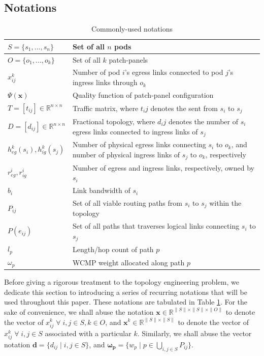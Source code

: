 \documentclass[sigconf]{acmart}
\theoremstyle{definition}
\begin{document}
\subsection{Notations}
\begin{table}
\begin{tabular}{|p{2.7cm}|p{5.3cm}|}
\hline
$S = \{s_1, ..., s_n\}$ & Set of all $n$ pods\\
\hline
$O = \{o_1, ..., o_k\}$ & Set of all $k$ patch-panels\\
\hline
$x_{ij}^k$ & Number of pod $i$'s egress links connected to pod $j$'s ingress links through $o_k$\\ 
\hline
$\Psi(\mathbf{x})$ & Quality function of patch-panel configuration\\
\hline
$T = [t_{ij}] \in \mathbb{R}^{n\times n}$ & Traffic matrix, where $t_ij$ denotes the sent from $s_i$ to $s_j$\\ 
\hline
$D = [d_{ij}] \in \mathbb{R}^{n\times n}$ & Fractional topology, where $d_ij$ denotes the number of $s_i$ egress links connected to ingress links of $s_j$\\ 
\hline
$h_{eg}^k(s_i), h_{ig}^k(s_j)$ & Number of physical egress links connecting $s_i$ to $o_k$, and number of physical ingress links of $s_j$ to $o_k$, respectively\\
\hline
$r_{eg}^i, r_{ig}^i$ & Number of egress and ingress links, respectively, owned by $s_i$\\
\hline
$b_i$ & Link bandwidth of $s_i$\\
\hline
$P_{ij}$ & Set of all viable routing paths from $s_i$ to $s_j$ within the topology\\
\hline
$P(e_{ij})$ & Set of all paths that traverses logical links connecting $s_i$ to $s_j$\\
\hline
$l_p$ & Length/hop count of path $p$ \\
\hline

$\omega_{p}$ & WCMP weight allocated along path $p$ \\
\hline
\end{tabular}
\caption{Commonly-used notations} 
\label{table:notations}
\end{table}
 Before giving a rigorous treatment to the topology engineering problem, we dedicate this section to introducing a series of recurring notations that will be used throughout this paper. These notations are tabulated in Table \ref{table:notations}. For the sake of convenience, we shall abuse the notation $\mathbf{x} \in \mathbb{R}^{\lVert S \lVert \times \lVert S \lVert \times \lVert O \lVert}$ to denote the vector of $x_{ij}^k \; \forall \; i, j \in S, k \in O$, and $\mathbf{x}^k \in \mathbb{R}^{\lVert S \lVert \times \lVert S \lVert}$ to denote the vector of $x_{ij}^k \; \forall \; i, j \in S$ associated with a particular $k$. Similarly, we shall abuse the vector notation $\mathbf{d} = \{d_{ij} \; | \; i, j \in S\}$, and $\boldsymbol{\omega_p} = \{w_p \; | \; p \in \bigcup\limits_{i, j \in S}P_{ij}\}$.
\end{document}
